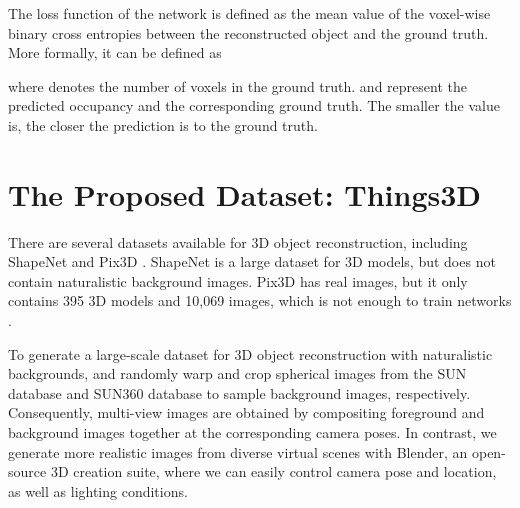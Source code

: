 \documentclass[twocolumn]{svjour3}
\begin{document}
The loss function of the network is defined as the mean value of the voxel-wise binary cross entropies between the reconstructed object and the ground truth.
More formally, it can be defined as


where  denotes the number of voxels in the ground truth.  and  represent the predicted occupancy and the corresponding ground truth.
The smaller the  value is, the closer the prediction is to the ground truth.

\section{The Proposed Dataset: Things3D}
\label{sec:things3d}

There are several datasets available for 3D object reconstruction, including ShapeNet \citep{DBLP:conf/cvpr/WuSKYZTX15} and Pix3D \citep{DBLP:conf/cvpr/Sun0ZZZXTF18}.
ShapeNet is a large dataset for 3D models, but does not contain naturalistic background images.
Pix3D has real images, but it only contains 395 3D models and 10,069 images, which is not enough to train networks \citep{DBLP:conf/cvpr/TatarchenkoRRLK19}.

To generate a large-scale dataset for 3D object reconstruction with naturalistic backgrounds, \cite{DBLP:conf/iccv/SuQLG15} and \cite{DBLP:conf/cvpr/LinWRSKFL19} randomly warp and crop spherical images from the SUN database \citep{DBLP:conf/cvpr/XiaoHEOT10} and SUN360 database \citep{DBLP:conf/cvpr/XiaoEOT12} to sample background images, respectively.
Consequently, multi-view images are obtained by compositing foreground and background images together at the corresponding camera poses.
In contrast, we generate more realistic images from diverse virtual scenes with Blender, an open-source 3D creation suite, where we can easily control camera pose and location, as well as lighting conditions.
\end{document}
